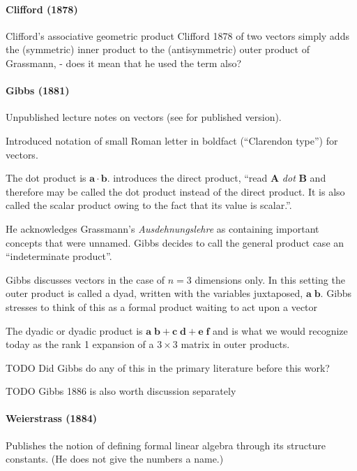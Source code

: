 \paragraph{Clifford (1878)~\cite{Clifford1878}}

Clifford’s associative geometric product
Clifford 1878 of two vectors simply adds the
(symmetric) inner product to the (antisymmetric) outer product of Grassmann, - does it mean that he used the term also?


\paragraph{Gibbs (1881)~\cite{Gibbs1881}}

Unpublished lecture notes on vectors (see \cite{Wilson1901} for published version).

Introduced notation of small Roman letter in boldfact (``Clarendon type'') for vectors.

The dot product is $\mathbf a \cdot \mathbf b$.
\cite[p. 55]{Wilson1901} introduces the direct product, ``read \textbf{A} \textit{dot} \textbf{B} and therefore may be called the dot product instead of the direct product. It is also called the scalar product owing to the fact that its value is scalar.''.

He acknowledges Grassmann's \textit{Ausdehnungslehre} as containing important concepts that were unnamed. Gibbs decides to call the general product case an ``indeterminate product''.

Gibbs discusses vectors in the case of $n=3$ dimensions only. In this setting the outer product is called a dyad, written with the variables juxtaposed, $\mathbf{ a \; b }$.
Gibbs stresses to think of this as a formal product waiting to act upon a vector

The dyadic or dyadic product is $\mathbf{ a \; b } + \mathbf{ c \; d } + \mathbf{ e \; f }$ and is what we would recognize today as the rank 1 expansion of a $3 \times 3$ matrix in outer products.

TODO Did Gibbs do any of this in the primary literature before this work?

TODO Gibbs 1886 is also worth discussion separately


\paragraph{Weierstrass (1884)~\cite{Weierstrass1884}}

Publishes the notion of defining formal linear algebra through its structure constants. (He does not give the numbers a name.)



